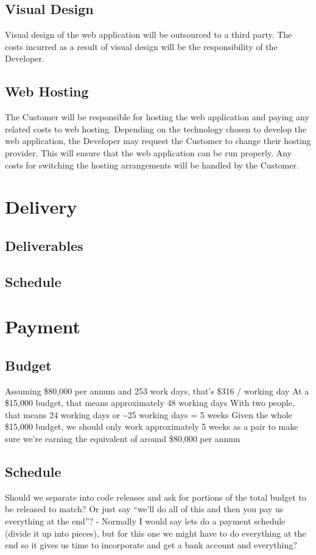 \documentclass[11pt]{article}
\begin{document}
\subsection{Visual Design}
Visual design of the web application will be outsourced to a third party. The costs incurred as a result of visual design will be the responsibility of the Developer.
\subsection{Web Hosting}
The Customer will be responsible for hosting the web application and paying any related costs to web hosting. Depending on the technology chosen to develop the web application, the Developer may request the Customer to change their hosting provider. This will ensure that the web application can be run properly. Any costs for switching the hosting arrangements will be handled by the Customer.
\section{Delivery}
\subsection{Deliverables}
\subsection{Schedule}
\section{Payment}	
\subsection{Budget}
Assuming \$80,000 per annum and 253 work days, that’s \$316 / working day
At a \$15,000 budget, that means approximately 48 working days
With two people, that means 24 working days or \~{}25 working days = 5 weeks
Given the whole \$15,000 budget, we should only work approximately 5 weeks as a pair to make sure we’re earning the equivalent of around \$80,000 per annum
\subsection{Schedule}
Should we separate into code releases and ask for portions of the total budget to be released to match? Or just say “we’ll do all of this and then you pay us everything at the end”?
- Normally I would say lets do a payment schedule (divide it up into pieces), but for this one we might have to do everything at the end so it gives us time to incorporate and get a bank account and everything?
\end{document}
